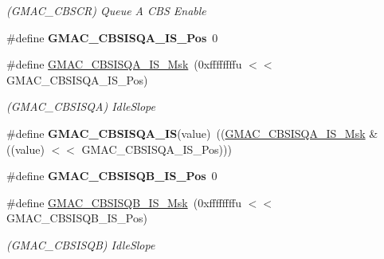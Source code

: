 \begin{DoxyCompactItemize}
\begin{DoxyCompactList}\small\item\em (G\+M\+A\+C\+\_\+\+C\+B\+S\+CR) Queue A C\+BS Enable \end{DoxyCompactList}\item 
\mbox{\label{group__SAMV71__GMAC_ga121f19cf515c56db9197a9f36fe48ae8}} 
\#define {\bfseries G\+M\+A\+C\+\_\+\+C\+B\+S\+I\+S\+Q\+A\+\_\+\+I\+S\+\_\+\+Pos}~0
\item 
\mbox{\label{group__SAMV71__GMAC_ga2f7f39464787c0436b82eb0befa6e690}} 
\#define \mbox{\hyperlink{group__SAMV71__GMAC_ga2f7f39464787c0436b82eb0befa6e690}{G\+M\+A\+C\+\_\+\+C\+B\+S\+I\+S\+Q\+A\+\_\+\+I\+S\+\_\+\+Msk}}~(0xffffffffu $<$$<$ G\+M\+A\+C\+\_\+\+C\+B\+S\+I\+S\+Q\+A\+\_\+\+I\+S\+\_\+\+Pos)
\begin{DoxyCompactList}\small\item\em (G\+M\+A\+C\+\_\+\+C\+B\+S\+I\+S\+QA) Idle\+Slope \end{DoxyCompactList}\item 
\mbox{\label{group__SAMV71__GMAC_ga508ac4b0b1ce55827d54ed3a825922c0}} 
\#define {\bfseries G\+M\+A\+C\+\_\+\+C\+B\+S\+I\+S\+Q\+A\+\_\+\+IS}(value)~((\mbox{\hyperlink{group__SAMV71__GMAC_ga2f7f39464787c0436b82eb0befa6e690}{G\+M\+A\+C\+\_\+\+C\+B\+S\+I\+S\+Q\+A\+\_\+\+I\+S\+\_\+\+Msk}} \& ((value) $<$$<$ G\+M\+A\+C\+\_\+\+C\+B\+S\+I\+S\+Q\+A\+\_\+\+I\+S\+\_\+\+Pos)))
\item 
\mbox{\label{group__SAMV71__GMAC_gaa3940ed634fcc9e2e22557a9af7c54aa}} 
\#define {\bfseries G\+M\+A\+C\+\_\+\+C\+B\+S\+I\+S\+Q\+B\+\_\+\+I\+S\+\_\+\+Pos}~0
\item 
\mbox{\label{group__SAMV71__GMAC_gae23af9b2e081f22e3575d37ee39ee8f5}} 
\#define \mbox{\hyperlink{group__SAMV71__GMAC_gae23af9b2e081f22e3575d37ee39ee8f5}{G\+M\+A\+C\+\_\+\+C\+B\+S\+I\+S\+Q\+B\+\_\+\+I\+S\+\_\+\+Msk}}~(0xffffffffu $<$$<$ G\+M\+A\+C\+\_\+\+C\+B\+S\+I\+S\+Q\+B\+\_\+\+I\+S\+\_\+\+Pos)
\begin{DoxyCompactList}\small\item\em (G\+M\+A\+C\+\_\+\+C\+B\+S\+I\+S\+QB) Idle\+Slope \end{DoxyCompactList}\item 
\mbox{\label{group__SAMV71__GMAC_ga3c070c2312a484c1ea416e37a2bc455e}} 
$$
\end{DoxyCompactItemize}
